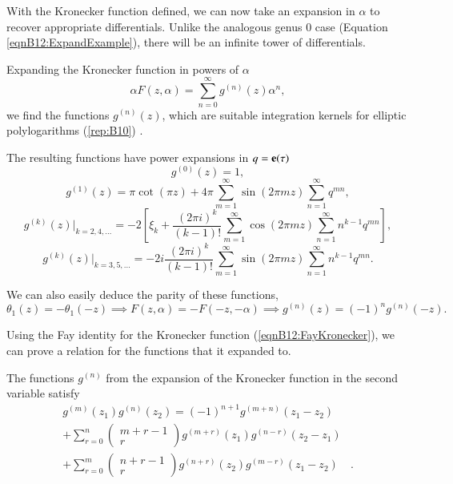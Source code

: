 With the Kronecker function defined, we can now take an expansion in $\alpha$ to recover appropriate differentials. Unlike the analogous genus 0 case (Equation \ref{eqnB12:ExpandExample}), there will be an infinite tower of differentials.

\begin{definition}
    Expanding the Kronecker function in powers of $\alpha$
    \begin{equation}
        \alpha F(z,\alpha) = \sum_{n=0}^{\infty} g^{(n)}(z) \alpha^n,
    \end{equation}
    we find the functions $g^{(n)}(z)$, which are suitable integration kernels for elliptic polylogarithms (\ref{rep:B10}) \cite{Broedel_2022}.
\end{definition}

The resulting functions have power expansions in $q = \mathbf{e}(\tau)$ \cite{Broedel_2015}
\begin{equation}
    g^{(0)}(z) = 1,
\end{equation}
\begin{equation}
    g^{(1)}(z) = \pi \cot(\pi z) + 4 \pi \sum_{m=1}^\infty \sin(2 \pi m z) \sum_{n=1}^\infty q^{mn},
\end{equation}
\begin{equation}
    g^{(k)}(z)\big|_{k=2,4,\ldots} = -2\left[\xi_k + \frac{(2\pi i)^k}{(k-1)!} \sum_{m=1}^\infty \cos(2 \pi m z) \sum_{n=1}^\infty n^{k-1} q^{mn} \right],
\end{equation}
\begin{equation}
    g^{(k)}(z)\big|_{k=3,5,\ldots} = -2i \frac{(2\pi i)^k}{(k-1)!} \sum_{m=1}^\infty \sin(2\pi mz) \sum_{n=1}^\infty n^{k-1} q^{mn}.
\end{equation}

We can also easily deduce the parity of these functions,
\begin{equation}
    \theta_1(z) = -\theta_1(-z) \implies F(z,\alpha) = -F(-z,-\alpha) \implies g^{(n)}(z)=(-1)^n g^{(n)}(-z).
\end{equation}


Using the Fay identity for the Kronecker function (\ref{eqnB12:FayKronecker}), we can prove a relation for the functions that it expanded to.

\begin{lemma}
    The functions $g^{(n)}$ from the expansion of the Kronecker function in the second variable satisfy
    \begin{align}
        g^{(m)}(z_1) g^{(n)}(z_2) = (-1)^{n+1} g^{(m+n)}(z_1-z_2)& \\
         +\sum_{r=0}^n \begin{pmatrix} m+r-1 \\ r \end{pmatrix} g^{(m+r)}(z_1) g^{(n-r)}(z_2-z_1) & \\
         +\sum_{r=0}^m \begin{pmatrix} n+r-1 \\ r \end{pmatrix} g^{(n+r)}(z_2) g^{(m-r)}(z_1-z_2) & .
    \end{align}
\end{lemma}

